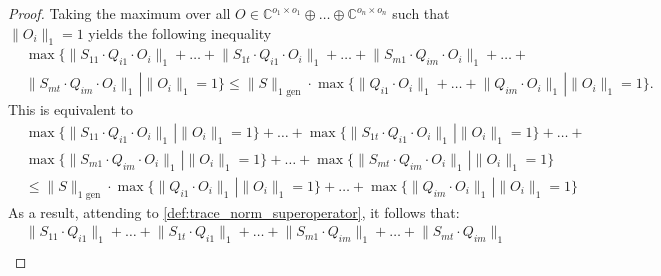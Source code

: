 \begin{proof}
  Taking the maximum over all $O \in \mathbb{C}^{o_1 \times o_1} \oplus \ldots \oplus \mathbb{C}^{o_n \times o_n}$ such that $\lVert O_i \rVert_{1} = 1$ yields the following inequality 
  \begin{equation}
    \begin{split}
    & \max \{ \lVert S_{11} \cdot Q_{i1} \cdot O_{i} \rVert_{1} + \ldots + \lVert S_{1t} \cdot Q_{i1} \cdot O_{i} \rVert_{1} + \ldots + \lVert S_{m1} \cdot Q_{im} \cdot O_{i} \rVert_{1} + \ldots +  \\
    &  \lVert S_{mt} \cdot Q_{im}  \cdot O_{i} \rVert_{1} \hspace{1pt} |\lVert O_i \rVert_{1} = 1 \} \leq  \lVert S  \rVert_{1 \text{ gen}} \cdot \max \{ \lVert Q_{i1} \cdot O_{i} \rVert_{1} + \ldots + \lVert Q_{im} \cdot O_{i} \rVert_{1} \hspace{1pt} |\lVert O_i \rVert_{1} = 1 \}.
    \end{split}
  \end{equation}
  This is equivalent to
  \begin{equation}
    \begin{split}
    & \max \{ \lVert S_{11} \cdot Q_{i1} \cdot O_{i} \rVert_{1} \hspace{1pt}|\lVert O_i \rVert_{1} = 1 \} + \ldots + \max \{\lVert S_{1t} \cdot Q_{i1} \cdot O_{i} \rVert_{1}  \hspace{1pt}|\lVert O_i \rVert_{1} = 1 \}  + \ldots +   \\
    & \max \{\lVert S_{m1} \cdot Q_{im} \cdot O_{i} \rVert_{1} \hspace{1pt}|\lVert O_i \rVert_{1} = 1 \} + \ldots + \max \{ \lVert S_{mt} \cdot Q_{im}  \cdot O_{i} \rVert_{1} \hspace{1pt} |\lVert O_i \rVert_{1} = 1 \}  \\
    & \leq  \lVert S  \rVert_{1 \text{ gen}} \cdot \max \{ \lVert Q_{i1} \cdot O_{i} \rVert_{1}  \hspace{1pt} |\lVert O_i \rVert_{1} = 1 \}  + \ldots + \max \{\lVert Q_{im} \cdot O_{i} \rVert_{1} \hspace{1pt} |\lVert O_i \rVert_{1} = 1 \} 
    \end{split}
  \end{equation}
  As a result, attending to \autoref{def:trace_norm_superoperator}, it follows that:
  \begin{equation}
    \begin{split}
    & \lVert S_{11} \cdot Q_{i1} \rVert_{1} + \ldots + \lVert S_{1t} \cdot Q_{i1} \rVert_{1} + \ldots + \lVert S_{m1} \cdot Q_{im} \rVert_{1} + \ldots +  \lVert S_{mt} \cdot Q_{im} \rVert_{1} \\

\end{split}
\end{equation}
\end{proof}
